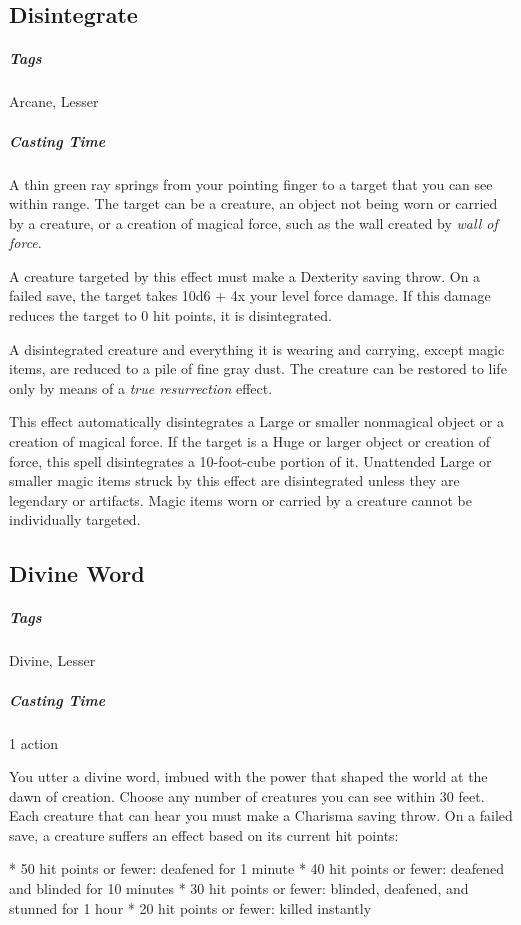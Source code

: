 

\subsection{Disintegrate}
\subparagraph*{Tags} Arcane, Lesser
\subparagraph*{Casting Time}

A thin green ray springs from your pointing finger to a target that you can see within range. The target can be a creature, an object not being worn or carried by a creature, or a creation of magical force, such as the wall created by \textit{wall of force}.

A creature targeted by this effect must make a Dexterity saving throw. On a failed save, the target takes 10d6 + 4x your level force damage. If this damage reduces the target to 0 hit points, it is disintegrated.

A disintegrated creature and everything it is wearing and carrying, except magic items, are reduced to a pile of fine gray dust. The creature can be restored to life only by means of a \textit{true resurrection} effect.

This effect automatically disintegrates a Large or smaller nonmagical object or a creation of magical force. If the target is a Huge or larger object or creation of force, this spell disintegrates a 10-foot-cube portion of it. Unattended Large or smaller magic items struck by this effect are disintegrated unless they are legendary or artifacts. Magic items worn or carried by a creature cannot be individually targeted.

\subsection{Divine Word}
\subparagraph*{Tags} Divine, Lesser
\subparagraph*{Casting Time} 1 action

You utter a divine word, imbued with the power that shaped the world at the dawn of creation. Choose any number of creatures you can see within 30 feet. Each creature that can hear you must make a Charisma saving throw. On a failed save, a creature suffers an effect based on its current hit points:

* 50 hit points or fewer: deafened for 1 minute
* 40 hit points or fewer: deafened and blinded for 10 minutes
* 30 hit points or fewer: blinded, deafened, and stunned for 1 hour
* 20 hit points or fewer: killed instantly 

